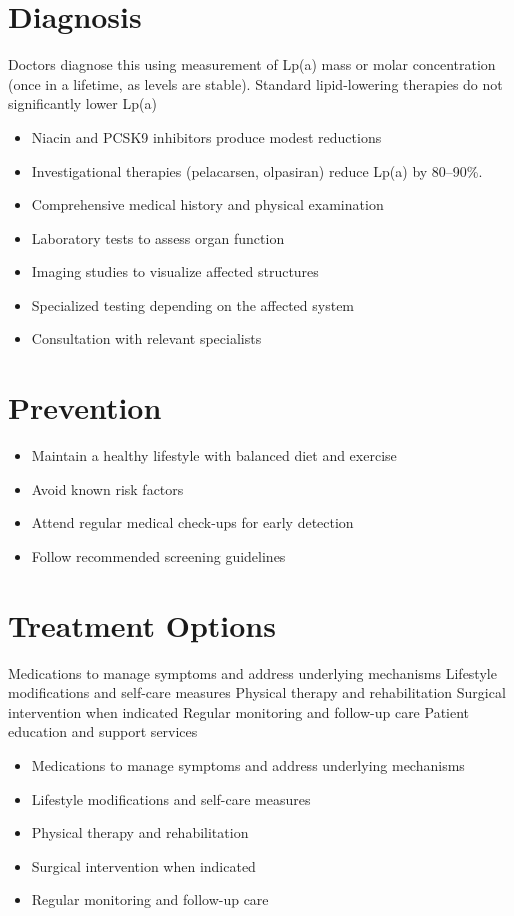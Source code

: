 \section{Diagnosis}
Doctors diagnose this using measurement of Lp(a) mass or molar concentration (once in a lifetime, as levels are stable). Standard lipid-lowering therapies do not significantly lower Lp(a)

\begin{itemize}[noitemsep]
  \item Niacin and PCSK9 inhibitors produce modest reductions
  \item Investigational therapies (pelacarsen, olpasiran) reduce Lp(a) by 80--90\%.
  \item Comprehensive medical history and physical examination
  \item Laboratory tests to assess organ function
  \item Imaging studies to visualize affected structures
  \item Specialized testing depending on the affected system
  \item Consultation with relevant specialists
\end{itemize}
\section{Prevention}
\begin{itemize}[noitemsep]
  \item Maintain a healthy lifestyle with balanced diet and exercise
  \item Avoid known risk factors
  \item Attend regular medical check-ups for early detection
  \item Follow recommended screening guidelines
\end{itemize}
\section{Treatment Options}
Medications to manage symptoms and address underlying mechanisms Lifestyle modifications and self-care measures Physical therapy and rehabilitation Surgical intervention when indicated Regular monitoring and follow-up care Patient education and support services

\begin{itemize}[noitemsep]
  \item Medications to manage symptoms and address underlying mechanisms
  \item Lifestyle modifications and self-care measures
  \item Physical therapy and rehabilitation
  \item Surgical intervention when indicated
  \item Regular monitoring and follow-up care
\end{itemize}
